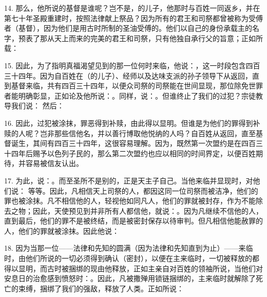 14. 那么，他所说的基督是谁呢？岂不是，的儿子，他那时与百姓一同返乡，并在第七十年圣殿重建时，按照法律献上祭品？因为所有的君王和司祭都曾被称为受傅者（基督），因为他们是用古时所制的圣油受傅的。他们以自己的身份承载主的名字，预表了那从天上而来的完美的君王和司祭，只有他独自承行父的旨意；正如所载：\par

15. 因此，为了指明真福渴望见到的那一位何时来临，他说：，这一时段包含四百三十四年。因为自百姓在（的儿子）、经师以及达味支派的孙子领导下从返回，直到基督来临，共有四百三十四年，以便众司祭的司祭能在世间显现，那位除免世罪者能明确彰显，正如论及他所说：。同样，说：。但谁终止了我们的过犯？宗徒教导我们说： 然后：\par

16. 因此，过犯被涂抹，罪恶得到补赎，由此得以显明。但谁是为他们的罪得到补赎的人呢？岂非那些信他名，并以善行博取他悦纳的人吗？自百姓从返回，直至基督诞生，其间有四百三十四年，这很容易理解。因为，既然第一次盟约是在四百三十四年后赐予以色列子民的，那么第二次盟约也应以相同的时间界定，以便百姓期待，并容易被信友认出。\par

17. 为此，说：。而至圣所不是别的，正是天主子自己。当他来临并显现时，对他们说： 等等。因此，凡相信天上司祭的人，都因这同一位司祭而被洁净，他们的罪也被涂抹。凡不相信他的人，轻视他如同凡人，他们的罪就被封存，作为不能除去之物；因此，天使预见到并非所有人都信他，就说：。因为凡继续不信他的人，直到最后，他们的罪不是被终结，而是被密封保存以待审判。但凡相信他能赦罪的人，他们的罪就被涂抹。因此他说：\par

18. 因为当那一位——法律和先知的圆满（因为法律和先知直到为止）——来临时，由他们所说的一切必须得到确认（密封），以便在主来临时，一切被释放的都得以显明，而古时被捆绑的现由他释放，正如主亲自对百姓的领袖所说，当他们对安息日的治愈感到愤怒时：。因此，凡被撒殚用锁链捆绑的，主来临时就解除了死亡的束缚，捆绑了我们的强敌，释放了人类。正如所说：\par

